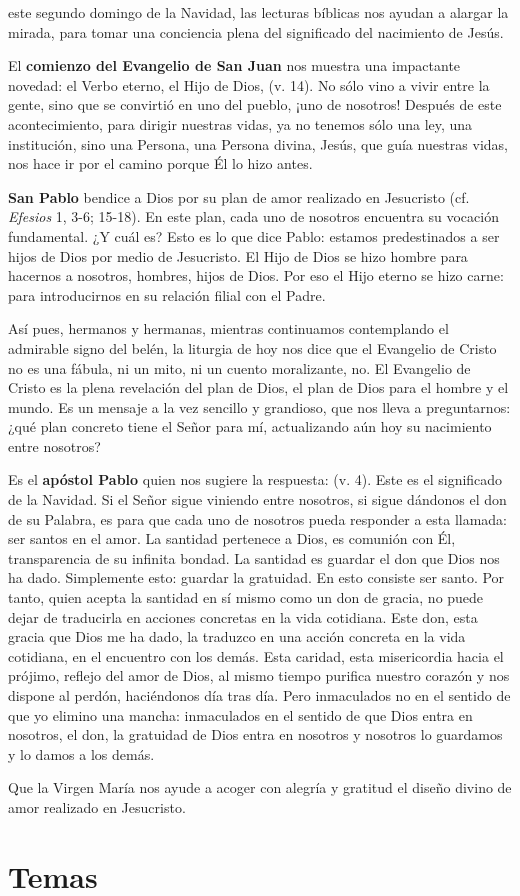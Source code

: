 \begin{body}
	 este segundo domingo de la Navidad, las lecturas bíblicas nos ayudan a alargar la mirada, para tomar una conciencia plena del significado del nacimiento de Jesús.
	
	El \textbf{comienzo del Evangelio de San Juan} nos muestra una impactante novedad: el Verbo eterno, el Hijo de Dios,  (v. 14). No sólo vino a vivir entre la gente, sino que se convirtió en uno del pueblo, ¡uno de nosotros! Después de este acontecimiento, para dirigir nuestras vidas, ya no tenemos sólo una ley, una institución, sino una Persona, una Persona divina, Jesús, que guía nuestras vidas, nos hace ir por el camino porque Él lo hizo antes.
	
	\textbf{San Pablo} bendice a Dios por su plan de amor realizado en Jesucristo (cf. \emph{Efesios} 1, 3-6; 15-18). En este plan, cada uno de nosotros encuentra su vocación fundamental. ¿Y cuál es? Esto es lo que dice Pablo: estamos predestinados a ser hijos de Dios por medio de Jesucristo. El Hijo de Dios se hizo hombre para hacernos a nosotros, hombres, hijos de Dios. Por eso el Hijo eterno se hizo carne: para introducirnos en su relación filial con el Padre.
	
	Así pues, hermanos y hermanas, mientras continuamos contemplando el admirable signo del belén, la liturgia de hoy nos dice que el Evangelio de Cristo no es una fábula, ni un mito, ni un cuento moralizante, no. El Evangelio de Cristo es la plena revelación del plan de Dios, el plan de Dios para el hombre y el mundo. Es un mensaje a la vez sencillo y grandioso, que nos lleva a preguntarnos: ¿qué plan concreto tiene el Señor para mí, actualizando aún hoy su nacimiento entre nosotros?
	
	Es el \textbf{apóstol Pablo} quien nos sugiere la respuesta:  (v. 4). Este es el significado de la Navidad. Si el Señor sigue viniendo entre nosotros, si sigue dándonos el don de su Palabra, es para que cada uno de nosotros pueda responder a esta llamada: ser santos en el amor. La santidad pertenece a Dios, es comunión con Él, transparencia de su infinita bondad. La santidad es guardar el don que Dios nos ha dado. Simplemente esto: guardar la gratuidad. En esto consiste ser santo. Por tanto, quien acepta la santidad en sí mismo como un don de gracia, no puede dejar de traducirla en acciones concretas en la vida cotidiana. Este don, esta gracia que Dios me ha dado, la traduzco en una acción concreta en la vida cotidiana, en el encuentro con los demás. Esta caridad, esta misericordia hacia el prójimo, reflejo del amor de Dios, al mismo tiempo purifica nuestro corazón y nos dispone al perdón, haciéndonos  día tras día. Pero inmaculados no en el sentido de que yo elimino una mancha: inmaculados en el sentido de que Dios entra en nosotros, el don, la gratuidad de Dios entra en nosotros y nosotros lo guardamos y lo damos a los demás.
	
	Que la Virgen María nos ayude a acoger con alegría y gratitud el diseño divino de amor realizado en Jesucristo.
\end{body}

\newsection

\section{Temas}

	